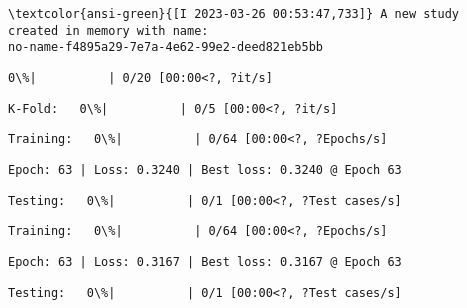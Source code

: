 \documentclass[11pt]{article}
\begin{document}
    \begin{Verbatim}[commandchars=\\\{\}]
\textcolor{ansi-green}{[I 2023-03-26 00:53:47,733]} A new study created in memory with name:
no-name-f4895a29-7e7a-4e62-99e2-deed821eb5bb
    \end{Verbatim}

    
    \begin{Verbatim}[commandchars=\\\{\}]
  0\%|          | 0/20 [00:00<?, ?it/s]
    \end{Verbatim}

    
    
    \begin{Verbatim}[commandchars=\\\{\}]
K-Fold:   0\%|          | 0/5 [00:00<?, ?it/s]
    \end{Verbatim}

    
    
    \begin{Verbatim}[commandchars=\\\{\}]
Training:   0\%|          | 0/64 [00:00<?, ?Epochs/s]
    \end{Verbatim}

    
    \begin{Verbatim}[commandchars=\\\{\}]
Epoch: 63 | Loss: 0.3240 | Best loss: 0.3240 @ Epoch 63
    \end{Verbatim}

    
    \begin{Verbatim}[commandchars=\\\{\}]
Testing:   0\%|          | 0/1 [00:00<?, ?Test cases/s]
    \end{Verbatim}

    
    
    \begin{Verbatim}[commandchars=\\\{\}]
Training:   0\%|          | 0/64 [00:00<?, ?Epochs/s]
    \end{Verbatim}

    
    \begin{Verbatim}[commandchars=\\\{\}]
Epoch: 63 | Loss: 0.3167 | Best loss: 0.3167 @ Epoch 63
    \end{Verbatim}

    
    \begin{Verbatim}[commandchars=\\\{\}]
Testing:   0\%|          | 0/1 [00:00<?, ?Test cases/s]
    \end{Verbatim}
\end{document}

